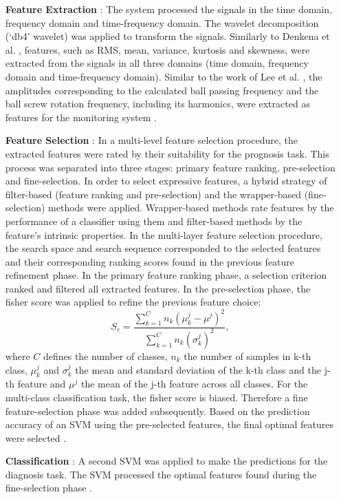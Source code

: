 \begin{itemize}
    \item [\textbf{Feature Extraction}]: The system processed the signals in the time domain, frequency domain and time-frequency domain. The wavelet decomposition (‘db4’ wavelet) was applied to transform the signals. Similarly to Denkena et al. \cite{Denkena2021}, features, such as RMS, mean, variance, kurtosis and skewness, were extracted from the signals in all three domains (time domain, frequency domain and time-frequency domain). Similar to the work of Lee et al. \cite{Lee2015}, the amplitudes corresponding to the calculated ball passing frequency and the ball screw rotation frequency, including its harmonics, were extracted as features for the monitoring system \cite{LiPin2018}.
    \item [\textbf{Feature Selection}]: In a multi-level feature selection procedure, the extracted features were rated by their suitability for the prognosis task. This process was separated into three stages: primary feature ranking, pre-selection and fine-selection. In order to select expressive features, a hybrid strategy of filter-based (feature ranking and pre-selection) and the wrapper-based (fine-selection) methods were applied. Wrapper-based methods rate features by the performance of a classifier using them and filter-based methods by the feature's intrinsic properties. In the multi-layer feature selection procedure, the search space and search sequence corresponded to the selected features and their corresponding ranking scores found in the previous feature refinement phase. In the primary feature ranking phase, a selection criterion ranked and filtered all extracted features. In the pre-selection phase, the fisher score was applied to refine the previous feature choice:
    \begin{equation}
        S_{c} = \frac{\sum_{k=1}^{C} n_{k}(\mu_{k}^{j}-\mu^{j})^{2}}{\sum_{k=1}^{C}n_{k}(\sigma_{k}^{j})^{2}},
    \end{equation}
    where $C$ defines the number of classes, $n_{k}$ the number of samples in k-th class, $\mu_{k}^{j}$ and $\sigma_{k}^{j}$ the mean and standard deviation of the k-th class and the j-th feature and $\mu^{j}$ the mean of the j-th feature across all classes. For the multi-class classification task, the fisher score is biased. Therefore a fine feature-selection phase was added subsequently. Based on the prediction accuracy of an SVM using the pre-selected features, the final optimal features were selected \cite{LiPin2018}.
    \item [\textbf{Classification}]: A second SVM was applied to make the predictions for the diagnosis task. The SVM processed the optimal features found during the fine-selection phase \cite{LiPin2018}. 
\end{itemize}

